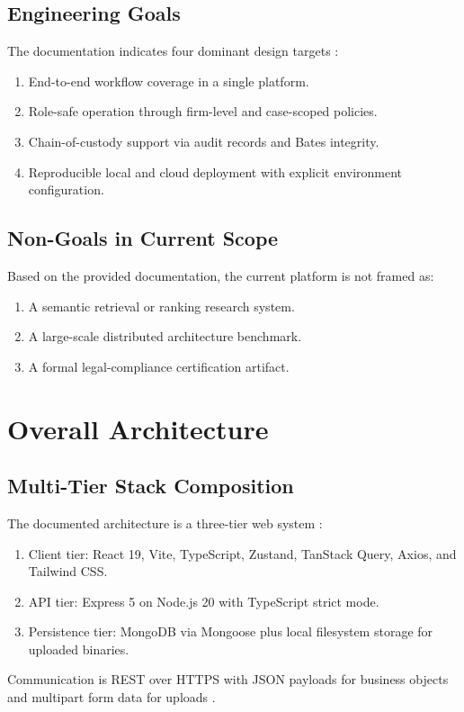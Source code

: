 \documentclass[conference]{IEEEtran}
\begin{document}
\subsection{Engineering Goals}
The documentation indicates four dominant design targets \cite{arch,roles,setup}:
\begin{enumerate}
\item End-to-end workflow coverage in a single platform.
\item Role-safe operation through firm-level and case-scoped policies.
\item Chain-of-custody support via audit records and Bates integrity.
\item Reproducible local and cloud deployment with explicit environment configuration.
\end{enumerate}

\subsection{Non-Goals in Current Scope}
Based on the provided documentation, the current platform is not framed as:
\begin{enumerate}
\item A semantic retrieval or ranking research system.
\item A large-scale distributed architecture benchmark.
\item A formal legal-compliance certification artifact.
\end{enumerate}

\section{Overall Architecture}
\subsection{Multi-Tier Stack Composition}
The documented architecture is a three-tier web system \cite{arch}:
\begin{enumerate}
\item Client tier: React 19, Vite, TypeScript, Zustand, TanStack Query, Axios, and Tailwind CSS.
\item API tier: Express 5 on Node.js 20 with TypeScript strict mode.
\item Persistence tier: MongoDB via Mongoose plus local filesystem storage for uploaded binaries.
\end{enumerate}

Communication is REST over HTTPS with JSON payloads for business objects and multipart form data for uploads \cite{arch,api}.
\end{document}
